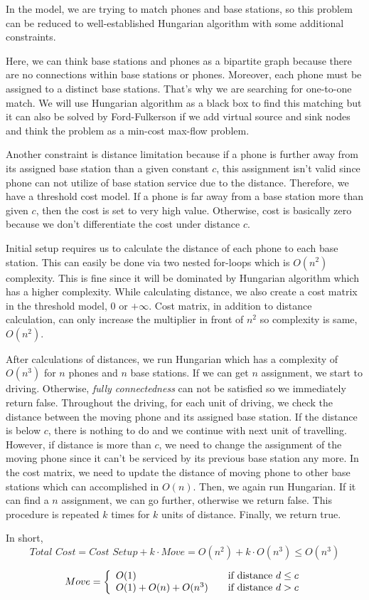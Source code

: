 In the model, we are trying to match phones and base stations, so this problem can be reduced to well-established Hungarian algorithm with some additional constraints.

Here, we can think base stations and phones as a bipartite graph because there are no connections within base stations or phones. Moreover, each phone must be assigned to a distinct base stations. That's why we are searching for one-to-one match. We will use Hungarian algorithm as a black box to find this matching but it can also be solved by Ford-Fulkerson if we add virtual source and sink nodes and think the problem as a min-cost max-flow problem.

Another constraint is distance limitation because if a phone is further away from its assigned base station than a given constant $c$, this assignment isn't valid since phone can not utilize of base station service due to the distance. Therefore, we have a threshold cost model. If a phone is far away from a base station more than given $c$, then the cost is set to very high value. Otherwise, cost is basically zero because we don't differentiate the cost under distance $c$.

Initial setup requires us to calculate the distance of each phone to each base station. This can easily be done via two nested for-loops which is $O(n^2)$ complexity. This is fine since it will be dominated by Hungarian algorithm which has a higher complexity. While calculating distance, we also create a cost matrix in the threshold model, 0 or $+\infty$.  Cost matrix, in addition to distance calculation, can only increase the multiplier in front of $n^2$ so complexity is same, $O(n^2)$.

After calculations of distances, we run Hungarian which has a complexity of $O(n^3)$ for $n$ phones and $n$ base stations. If we can get $n$ assignment, we start to driving. Otherwise, \textit{fully connectedness} can not be satisfied so we immediately return false. Throughout the driving, for each unit of driving, we check the distance between the moving phone and its assigned base station. If the distance is below $c$, there is nothing to do and we continue with next unit of travelling. However, if distance is more than $c$, we need to change the assignment of the moving phone since it can't be serviced by its previous base station any more. In the cost matrix, we need to update the distance of moving phone to other base stations which can accomplished in $O(n)$. Then, we again run Hungarian. If it can find a $n$ assignment, we can go further, otherwise we return false. This procedure is repeated $k$ times for $k$ units of distance. Finally, we return true.

In short, 
$$
  \textit{Total Cost} = \textit{Cost Setup} + k \cdot Move = O(n^2) + k \cdot O(n^3) \leq O(n^3)
$$

\[
  Move = \left\{ 
  \begin{array}{l l}
    O(1) & \quad \text{if distance $d \leq c$}\\
    O(1) + O(n) + O(n^3) & \quad \text{if distance $d > c$}\\
  \end{array} \right.
\]